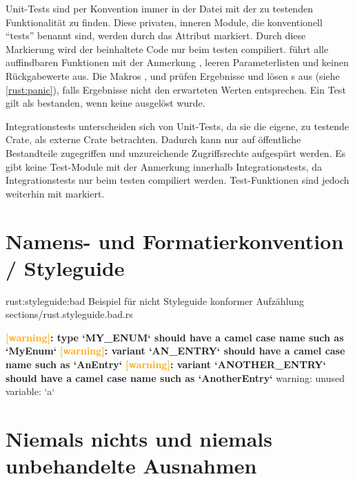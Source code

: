 Unit-Tests sind per Konvention immer in der Datei mit der zu testenden Funktionalität zu finden.
Diese privaten, inneren Module, die konventionell \enquote{tests} benannt sind, werden durch das Attribut  markiert.
Durch diese Markierung wird der beinhaltete Code nur beim testen compiliert.
 führt alle auffindbaren Funktionen mit der Anmerkung \rustcinline{#[test]}, leeren Parameterlisten und keinen Rückgabewerte aus.
Die Makros ,  und  prüfen Ergebnisse und lösen s aus (siehe \autoref{rust:panic}), falls Ergebnisse nicht den erwarteten Werten entsprechen.
Ein Test gilt als bestanden, wenn keine  ausgelöst wurde.

Integrationstests unterscheiden sich von Unit-Tests, da sie die eigene, zu testende Crate, als externe Crate betrachten.
Dadurch kann nur auf öffentliche Bestandteile zugegriffen und unzureichende Zugriffsrechte aufgespürt werden.
Es gibt keine Test-Module mit der  Anmerkung innerhalb Integrationstests, da Integrationstests nur beim testen compiliert werden.
Test-Funktionen sind jedoch weiterhin mit \rustcinline{#[test]} markiert.


\section{Namens- und Formatierkonvention / Styleguide}

\rustcinclude
	{rust:styleguide:bad}
	{Beispiel für nicht Styleguide konformer Aufzählung}
	{sections/rust.styleguide.bad.rs}

\begin{small}
	\textbf{\textcolor{orange}{[warning]}: type `MY\_ENUM` should have a camel case name such as `MyEnum`}
	\textbf{\textcolor{orange}{[warning]}: variant `AN\_ENTRY` should have a camel case name such as `AnEntry`}
	\textbf{\textcolor{orange}{[warning]}: variant `ANOTHER\_ENTRY` should have a camel case name such as `AnotherEntry`}
	warning: unused variable: `a`
\end{small}
\cite{rust:styleguide}




\section{Niemals nichts und niemals unbehandelte Ausnahmen}
\label{rust:no_null}

